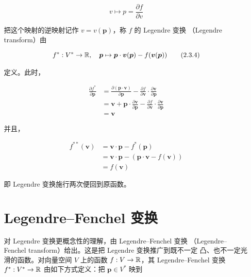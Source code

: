 \begin{equation}
  v\mapsto p = \frac{\partial f}{\partial v}
  \tag{2.3.3}
\end{equation}

把这个映射的逆映射记作 $v = v(\bm{p})$，称 $f$ 的 Legendre 变换
（Legendre transform）由

\begin{equation}
  f^* : V^*\to\mathbb{R},\quad
  \bm{p}\mapsto \bm{p}\cdot\bm{v}(\bm{p}) - f(\bm{v}(\bm{p}))
  \tag{2.3.4}
\end{equation}

定义。此时，

\begin{align}
  \frac{\partial f^*}{\partial\bm{p}}
    &= \frac{\partial(\bm{p}\cdot\bm{v})}{\partial\bm{p}}
     - \frac{\partial f}{\partial\bm{v}}\cdot
       \frac{\partial\bm{v}}{\partial\bm{p}} \tag{2.3.5}\\
  &= \bm{v} + \bm{p}\cdot\frac{\partial\bm{v}}{\partial\bm{p}}
     - \frac{\partial f}{\partial\bm{v}}\cdot
       \frac{\partial\bm{v}}{\partial\bm{p}} \tag{2.3.6}\\
  &= \bm{v} \tag{2.3.7}
\end{align}

并且，

\begin{align}
  f^{**}(\bm{v}) &= \bm{v}\cdot\bm{p} - f^*(\bm{p}) \tag{2.3.8}\\
  &= \bm{v}\cdot\bm{p} - (\bm{p}\cdot\bm{v} - f(\bm{v}))
     \tag{2.3.9}\\
  &= f(\bm{v}) \tag{2.3.10}
\end{align}

即 Legendre 变换施行两次便回到原函数。


\section{Legendre--Fenchel 变换}

对 Legendre 变换更概念性的理解，由 Legendre--Fenchel 变换
（Legendre--Fenchel transform）给出。这是把 Legendre 变换推广到既不一定
凸、也不一定光滑的函数。对向量空间 $V$ 上的函数 $f:V\to\mathbb{R}$，其
Legendre--Fenchel 变换 $f^*:V^*\to\mathbb{R}$ 由如下方式定义：把 $\bm{p}\in V^*$ 映到

